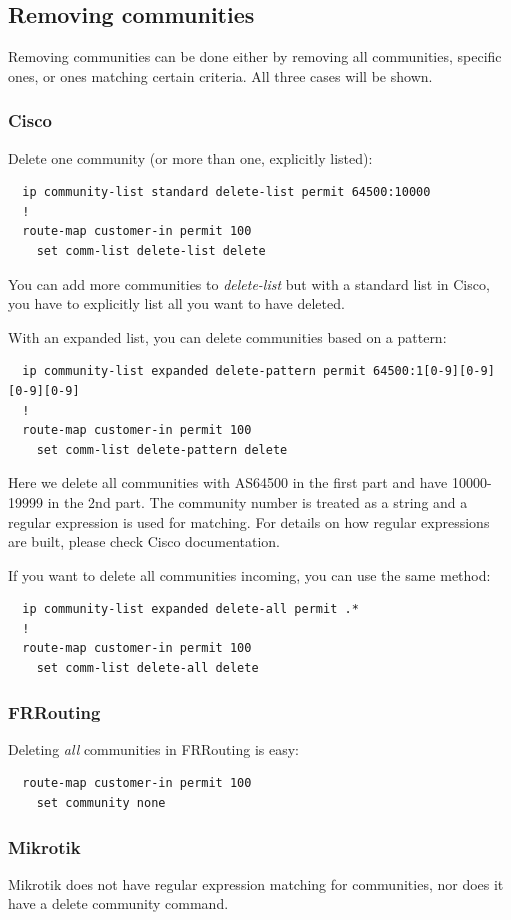 \subsection{Removing communities}
Removing communities can be done either by removing all communities, specific ones, or ones matching certain criteria. All three cases will be shown.

\subsubsection{Cisco}
Delete one community (or more than one, explicitly listed):
\begin{verbatim}
  ip community-list standard delete-list permit 64500:10000
  !
  route-map customer-in permit 100
    set comm-list delete-list delete
\end{verbatim}
You can add more communities to \emph{delete-list} but with a standard list in Cisco, you have to explicitly list all you want to have deleted.

With an expanded list, you can delete communities based on a pattern:
\begin{verbatim}
  ip community-list expanded delete-pattern permit 64500:1[0-9][0-9][0-9][0-9]
  !
  route-map customer-in permit 100
    set comm-list delete-pattern delete
\end{verbatim}
Here we delete all communities with AS64500 in the first part and have 10000-19999 in the 2nd part. The community number is treated as a string and a regular expression is used for matching. For details on how regular expressions are built, please check Cisco documentation.

If you want to delete all communities incoming, you can use the same method:
\begin{verbatim}
  ip community-list expanded delete-all permit .*
  !
  route-map customer-in permit 100
    set comm-list delete-all delete
\end{verbatim}

\subsubsection{FRRouting}
Deleting \emph{all}  communities in FRRouting is easy:
\begin{verbatim}
  route-map customer-in permit 100
    set community none
\end{verbatim}


\subsubsection{Mikrotik}
Mikrotik does not have regular expression matching for communities, nor does it have a delete community command.

